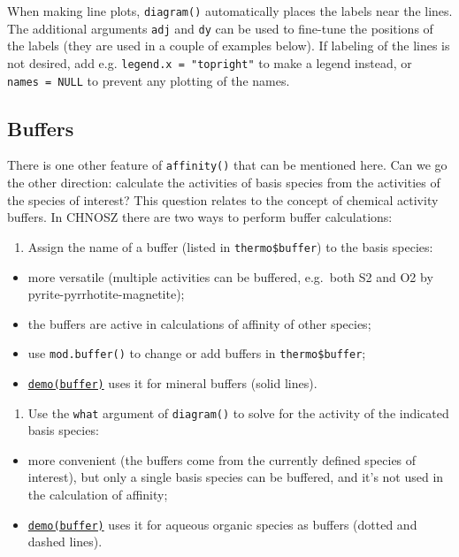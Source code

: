 \documentclass[]{tufte-handout}
\providecommand{\tightlist}{%
  \setlength{\itemsep}{0pt}\setlength{\parskip}{0pt}}
\begin{document}
When making line plots, {\texttt{diagram()}} automatically places the
labels near the lines. The additional arguments \texttt{adj} and
\texttt{dy} can be used to fine-tune the positions of the labels (they
are used in a couple of examples below). If labeling of the lines is not
desired, add e.g. \texttt{legend.x\ =\ "topright"} to make a legend
instead, or \texttt{names\ =\ NULL} to prevent any plotting of the
names.

\subsection{Buffers}\label{buffers}

There is one other feature of {\texttt{affinity()}} that can be
mentioned here. Can we go the other direction: calculate the activities
of basis species from the activities of the species of interest? This
question relates to the concept of chemical activity buffers. In CHNOSZ
there are two ways to perform buffer calculations:

\begin{enumerate}
\def\labelenumi{\arabic{enumi}.}
\tightlist
\item
  Assign the name of a buffer (listed in \texttt{thermo\$buffer}) to the
  basis species:
\end{enumerate}

\begin{itemize}
\tightlist
\item
  more versatile (multiple activities can be buffered, e.g.~both S2 and
  O2 by pyrite-pyrrhotite-magnetite);
\item
  the buffers are active in calculations of affinity of other species;
\item
  use {\texttt{mod.buffer()}} to change or add buffers in
  \texttt{thermo\$buffer};
\item
  \href{../demo}{{\texttt{demo(buffer)}}} uses it for mineral buffers
  (solid lines).
\end{itemize}

\begin{enumerate}
\def\labelenumi{\arabic{enumi}.}
\setcounter{enumi}{1}
\tightlist
\item
  Use the \texttt{what} argument of {\texttt{diagram()}} to solve for
  the activity of the indicated basis species:
\end{enumerate}

\begin{itemize}
\tightlist
\item
  more convenient (the buffers come from the currently defined species
  of interest), but only a single basis species can be buffered, and
  it's not used in the calculation of affinity;
\item
  \href{../demo}{{\texttt{demo(buffer)}}} uses it for aqueous organic
  species as buffers (dotted and dashed lines).
\end{itemize}
\end{document}
